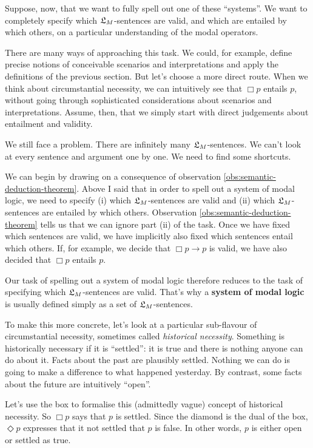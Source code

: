 Suppose, now, that we want to fully spell out one of these ``systems''. We want
to completely specify which $\mathfrak{L}_{M}$-sentences are valid, and which are entailed
by which others, on a particular understanding of the modal operators.

There are many ways of approaching this task. We could, for example, define
precise notions of conceivable scenarios and interpretations and apply the
definitions of the previous section. But let's choose a more direct route. When
we think about circumstantial necessity, we can intuitively see that $\Box p$
entails $p$, without going through sophisticated considerations about scenarios
and interpretations. Assume, then, that we simply start with direct judgements
about entailment and validity.

We still face a problem. There are infinitely many $\mathfrak{L}_{M}$-sentences. We can't
look at every sentence and argument one by one. We need to find some
shortcuts.

We can begin by drawing on a consequence of observation
\ref{obs:semantic-deduction-theorem}. Above I said that in order to spell out a
system of modal logic, we need to specify (i) which $\mathfrak{L}_{M}$-sentences are valid
and (ii) which $\mathfrak{L}_{M}$-sentences are entailed by which others. Observation
\ref{obs:semantic-deduction-theorem} tells us that we can ignore part (ii) of
the task. Once we have fixed which sentences are valid, we have implicitly
also fixed which sentences entail which others. If, for example, we decide
that $\Box p \to p$ is valid, we have also decided that $\Box p$ entails $p$.

Our task of spelling out a system of modal logic therefore reduces to
the task of specifying which $\mathfrak{L}_{M}$-sentences are valid. That's why a
\textbf{system of modal logic} is usually defined simply as a set of
$\mathfrak{L}_{M}$-sentences.

To make this more concrete, let's look at a particular sub-flavour of
circumstantial necessity, sometimes called \emph{historical necessity}.
Something is historically necessary if it is ``settled'': it is true and there
is nothing anyone can do about it. Facts about the past are plausibly settled.
Nothing we can do is going to make a difference to what happened yesterday. By
contrast, some facts about the future are intuitively ``open''.

Let's use the box to formalise this (admittedly vague) concept of historical
necessity. So $\Box p$ says that $p$ is settled. Since the diamond is the dual
of the box, $\Diamond p$ expresses that it not settled that $p$ is false. In
other words, $p$ is either open or settled as true.

